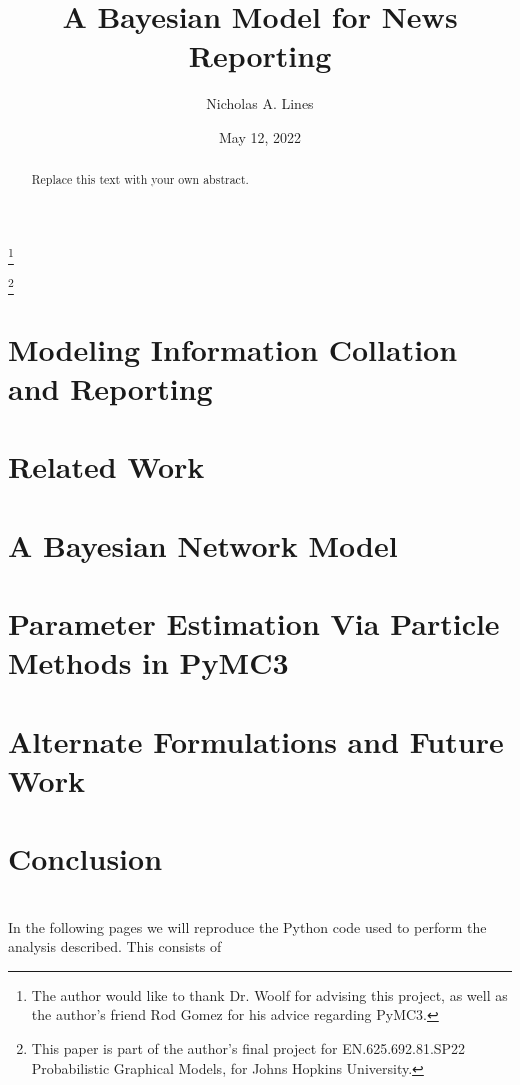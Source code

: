 \documentclass{amsart}
\theoremstyle{plain}
\numberwithin{equation}{section}
\begin{document}
\title[News Reporting]{A Bayesian Model for News Reporting}
\author{Nicholas A. Lines}
\address{}
\thanks{The author would like to thank Dr. Woolf for advising this project,
as well as the author's friend Rod Gomez for his advice regarding PyMC3.}
\date{May 12, 2022}
\thanks{This paper is part of the author's final project for
EN.625.692.81.SP22 Probabilistic Graphical Models, for Johns Hopkins
University.}

\begin{abstract}
Replace this text with your own abstract.
\end{abstract}

\maketitle

\section{Modeling Information Collation and Reporting}

\cite{zafarani2015evaluation}

\section{Related Work}

\section{A Bayesian Network Model}

\section{Parameter Estimation Via Particle Methods in PyMC3}

\section{Alternate Formulations and Future Work}

\section{Conclusion}




\section*{}

In the following pages we will reproduce the Python code used to perform the
analysis described. This consists of 
\end{document}
